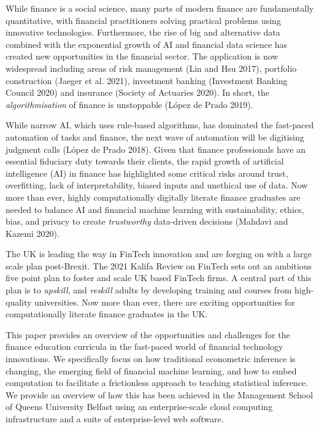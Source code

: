 \documentclass{article}
\begin{document}
While finance is a social science, many parts of modern finance are
fundamentally quantitative, with financial practitioners solving
practical problems using innovative technologies. Furthermore, the rise
of big and alternative data combined with the exponential growth of AI
and financial data science has created new opportunities in the
financial sector. The application is now widespread including areas of
risk management (Lin and Hsu 2017), portfolio construction (Jaeger et
al. 2021), investment banking (Investment Banking Council 2020) and
insurance (Society of Actuaries 2020). In short, the
\emph{algorithmisation} of finance is unstoppable (López de Prado 2019).

While narrow AI, which uses rule-based algorithms, has dominated the
fast-paced automation of tasks and finance, the next wave of automation
will be digitising judgment calls (López de Prado 2018). Given that
finance professionals have an essential fiduciary duty towards their
clients, the rapid growth of artificial intelligence (AI) in finance has
highlighted some critical risks around trust, overfitting, lack of
interpretability, biased inputs and unethical use of data. Now more than
ever, highly computationally digitally literate finance graduates are
needed to balance AI and financial machine learning with sustainability,
ethics, bias, and privacy to create \emph{trustworthy} data-driven
decisions (Mahdavi and Kazemi 2020).

The UK is leading the way in FinTech innovation and are forging on with
a large scale plan post-Brexit. The 2021 Kalifa Review on FinTech sets
out an ambitious five point plan to foster and scale UK based FinTech
firms. A central part of this plan is to \emph{upskill}, and
\emph{reskill} adults by developing training and courses from
high-quality universities. Now more than ever, there are exciting
opportunities for computationally literate finance graduates in the UK.

This paper provides an overview of the opportunities and challenges for
the finance education curricula in the fast-paced world of financial
technology innovations. We specifically focus on how traditional
econometric inference is changing, the emerging field of financial
machine learning, and how to embed computation to facilitate a
frictionless approach to teaching statistical inference. We provide an
overview of how this has been achieved in the Management School of
Queens University Belfast using an enterprise-scale cloud computing
infrastructure and a suite of enterprise-level web software.
\end{document}
